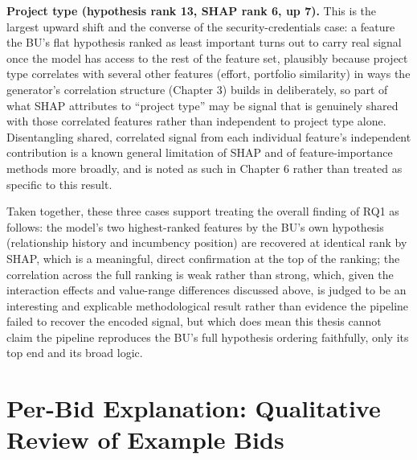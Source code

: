 \textbf{Project type (hypothesis rank 13, SHAP rank 6, up 7).} This is
the largest upward shift and the converse of the security-credentials
case: a feature the BU's flat hypothesis ranked as least important turns
out to carry real signal once the model has access to the rest of the
feature set, plausibly because project type correlates with several
other features (effort, portfolio similarity) in ways the generator's
correlation structure (Chapter 3) builds in deliberately, so part of
what SHAP attributes to ``project type'' may be signal that is genuinely
shared with those correlated features rather than independent to project
type alone. Disentangling shared, correlated signal from each individual
feature's independent contribution is a known general limitation of SHAP
and of feature-importance methods more broadly, and is noted as such in
Chapter 6 rather than treated as specific to this result.

Taken together, these three cases support treating the overall finding
of RQ1 as follows: the model's two highest-ranked features by the BU's
own hypothesis (relationship history and incumbency position) are
recovered at identical rank by SHAP, which is a meaningful, direct
confirmation at the top of the ranking; the correlation across the full
ranking is weak rather than strong, which, given the interaction effects
and value-range differences discussed above, is judged to be an
interesting and explicable methodological result rather than evidence
the pipeline failed to recover the encoded signal, but which does mean
this thesis cannot claim the pipeline reproduces the BU's full
hypothesis ordering faithfully, only its top end and its broad logic.

\hypertarget{per-bid-explanation-qualitative-review-of-example-bids}{%
\section{Per-Bid Explanation: Qualitative Review of Example
Bids}\label{per-bid-explanation-qualitative-review-of-example-bids}}

